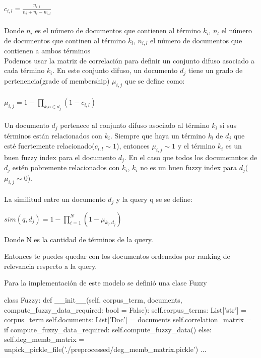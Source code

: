 \documentclass{llncs}
\begin{document}
$
    c_{i,l} =  \frac{n_{i,l}}{n_i+n_l-n_{i,l}}
$
\\\\
\noindent
Donde $n_i$ es el número de documentos que contienen al término $k_i$, $n_l$ el número de documentos
que continen al término $k_l$, $n_{i,l}$ el  número de documentos que contienen a ambos términos \\
Podemos usar la matriz de correlación para definir un conjunto difuso asociado a cada término $k_i$.
En este conjunto difuso, un documento $d_j$ tiene un grado de pertenencia(grade of membership) $\mu_{i,j}$
que se define como:\\\\
$
\mu_{i,j} = 1 - \prod_{k_ln \in d_j}^{}  (1-c_{i,l}) 
$
\\\\
\noindent
Un documento $d_j$ pertenece al conjunto difuso asociado al término $k_i$ si sus  términos están relacionados 
con $k_i$. Siempre que haya un término $k_l$ de $d_j$ que esté fuertemente relacionado($c_{i,l}\sim 1$), 
entonces $\mu_{i,j} \sim 1$ y el término $k_i$ es un buen fuzzy index para el documento $d_j$. En el caso 
que todos los documemntos de $d_j$ estén pobremente relacionados con $k_i$, $k_i$ no es un buen fuzzy 
index para $d_j$($\mu_{i,j}\sim 0 $).\\\\ 

La similitud entre un documento $d_j$ y la query q se se define:

$
    sim(q,d_j) = 1 - \prod_{i=1}^{N} (1 - \mu_{k_i,d_j})
$

Donde N es la cantidad de términos de la query.

Entonces te puedes quedar con los documentos ordenados por ranking de relevancia 
respecto a la query.

Para la implementación de este modelo se definió una clase Fuzzy
\begin{python}
class Fuzzy:
def __init__(self, corpus_term, documents, compute_fuzzy_data_required: bool = False):
    self.corpus_terms: List['str'] = corpus_term 
    self.documents: List['Doc'] = documents
    self.correlation_matrix = {}
    if compute_fuzzy_data_required:
        self.compute_fuzzy_data()
    else:
        self.deg_memb_matrix = unpick_pickle_file('./preprocessed/deg_memb_matrix.pickle')
    ...
\end{python}
\end{document}
